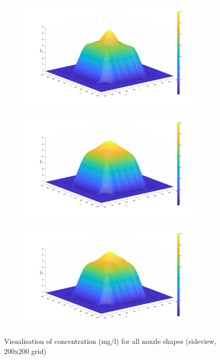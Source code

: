 \begin{figure}[ht!]
\centering
\begin{subfigure}{.33\textwidth}
  \centering
  \includegraphics[width=.9\linewidth]{Images/Round_side.jpg}
\end{subfigure}
\begin{subfigure}{.33\textwidth}
  \centering
  \includegraphics[width=.9\linewidth]{Images/Rec20_side.jpg}
\end{subfigure}
\begin{subfigure}{.33\textwidth}
  \centering
  \includegraphics[width=.9\linewidth]{Images/Rec30_side.jpg}
\end{subfigure}
\caption{Visualisation of concentration (mg/l) for all nozzle shapes (sideview, 200x200 grid)}
\label{fig:side_concentratie}
\end{figure}

